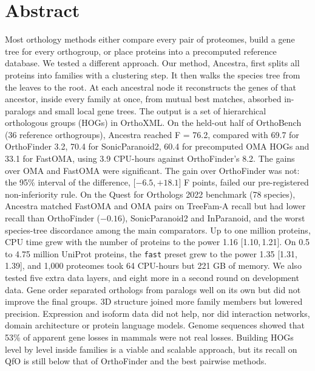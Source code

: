 \documentclass[10pt,letterpaper]{article}
\newcommand{\CI}[2]{[#1,\,#2]}
\begin{document}
\section*{Abstract}
Most orthology methods either compare every pair of proteomes, build a gene tree for every orthogroup, or place proteins into a precomputed reference database. We tested a different approach. Our method, Ancestra, first splits all proteins into families with a clustering step. It then walks the species tree from the leaves to the root. At each ancestral node it reconstructs the genes of that ancestor, inside every family at once, from mutual best matches, absorbed in-paralogs and small local gene trees. The output is a set of hierarchical orthologous groups (HOGs) in OrthoXML. On the held-out half of OrthoBench (36 reference orthogroups), Ancestra reached F = 76.2, compared with 69.7 for OrthoFinder 3.2, 70.4 for SonicParanoid2, 60.4 for precomputed OMA HOGs and 33.1 for FastOMA, using 3.9 CPU-hours against OrthoFinder's 8.2. The gains over OMA and FastOMA were significant. The gain over OrthoFinder was not: the 95\% interval of the difference, \CI{$-6.5$}{$+18.1$} F points, failed our pre-registered non-inferiority rule. On the Quest for Orthologs 2022 benchmark (78 species), Ancestra matched FastOMA and OMA pairs on TreeFam-A recall but had lower recall than OrthoFinder ($-0.16$), SonicParanoid2 and InParanoid, and the worst species-tree discordance among the main comparators. Up to one million proteins, CPU time grew with the number of proteins to the power 1.16 \CI{1.10}{1.21}. On 0.5 to 4.75 million UniProt proteins, the \texttt{fast} preset grew to the power 1.35 \CI{1.31}{1.39}, and 1,000 proteomes took 64 CPU-hours but 221 GB of memory. We also tested five extra data layers, and eight more in a second round on development data. Gene order separated orthologs from paralogs well on its own but did not improve the final groups. 3D structure joined more family members but lowered precision. Expression and isoform data did not help, nor did interaction networks, domain architecture or protein language models. Genome sequences showed that 53\% of apparent gene losses in mammals were not real losses. Building HOGs level by level inside families is a viable and scalable approach, but its recall on QfO is still below that of OrthoFinder and the best pairwise methods.
\end{document}
